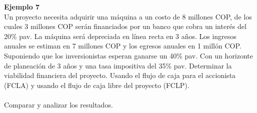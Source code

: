 \textbf{Ejemplo 7}\\
Un proyecto necesita adquirir una máquina a un costo de 8 millones COP, de los cuales 3 millones COP serán financiados por un banco que cobra un interés del 20\% pav. La máquina será depreciada en línea recta en 3 años. Los ingresos anuales se estiman en 7 millones COP y los egresos anuales en 1 millón COP. Suponiendo que los inversionistas esperan ganarse un 40\% pav. Con un horizonte de planeación de 3 años y una tasa impositiva del 35\% pav. Determinar la viabilidad financiera del proyecto. Usando el flujo de caja para el accionista (FCLA) y usando el flujo de caja libre del proyecto (FCLP).\\\\
Comparar y analizar los resultados.



